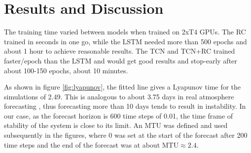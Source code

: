 \documentclass[%
 reprint,
 amsmath,amssymb,
 aps,
]{revtex4-2}
\begin{document}





\section{\label{sec:results}Results and Discussion} %

The training time varied between models when trained on 2xT4 GPUs. The RC trained in seconds in one go, while the LSTM needed more than 500 epochs and about 1 hour to achieve reasonable results. The TCN and TCN+RC trained faster/epoch than the LSTM and would get good results and stop-early after about 100-150 epochs, about 10 minutes.

As shown in figure \ref{fig:lyapunov}, the fitted line gives a Lyapunov time for the simulations of 2.49. This is analogous to about 3.75 days in real atmosphere forecasting \cite{Chattopadhyay2019}, thus forecasting more than 10 days tends to result in instability. In our case, as the forecast horizon is 600 time steps of 0.01, the time frame of stability of the system is close to its limit. An MTU was defined and used subsequently in the figures, where 0 was set at the start of the forecast after 200 time steps and the end of the forecast was at about \( \text{MTU} \approx 2.4 \). 
\end{document}
